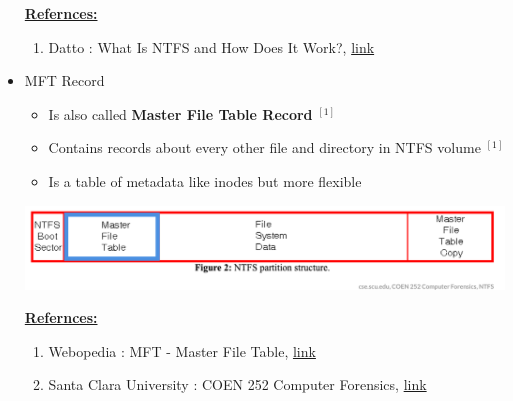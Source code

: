 \documentclass[12pt]{article}
\begin{document}
\begin{itemize}
    \bigskip

    \underline{\textbf{Refernces:}}

    \bigskip

    \begin{enumerate}[1)]
        \item Datto : What Is NTFS and How Does It Work?, \href{https://www.datto.com/library/what-is-ntfs-and-how-does-it-work}{link}
    \end{enumerate}
    \item MFT Record
    \begin{itemize}
        \item Is also called \textbf{Master File Table Record} $^{[1]}$
        \item Contains records about every other file and directory in NTFS volume $^{[1]}$
        \item Is a table of metadata like inodes but more flexible
    \end{itemize}

    \begin{center}
        \includegraphics[width=\linewidth]{images/week_9_notes_1_12.png}
    \end{center}

    \bigskip

    \underline{\textbf{Refernces:}}

    \bigskip

    \begin{enumerate}[1)]
        \item Webopedia : MFT - Master File Table, \href{https://www.webopedia.com/TERM/M/MFT.html}{link}
        \item Santa Clara University : COEN 252 Computer Forensics, \href{http://www.cse.scu.edu/~tschwarz/coen252_07Fall/Lectures/NTFS.html}{link}
    \end{enumerate}
\end{itemize}
\end{document}
